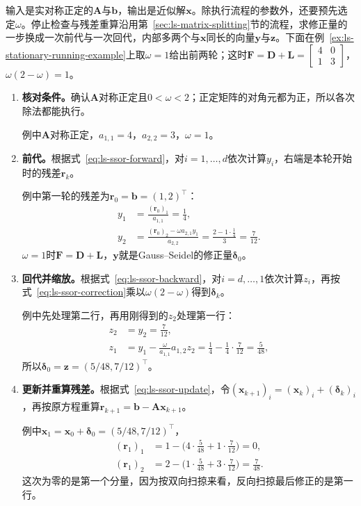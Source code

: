 输入是实对称正定的$\bm A$与$\bm b$，输出是近似解$\bm x$。除执行流程的参数外，还要预先选定$\omega$。停止检查与残差重算沿用第~\ref{sec:ls-matrix-splitting}节的流程，求修正量的一步换成一次前代与一次回代，内部多两个与$\bm x$同长的向量$\bm y$与$\bm z$。下面在例~\ref{ex:ls-stationary-running-example}上取$\omega=1$给出前两轮；这时$\bm F=\bm D+\bm L=\left[\begin{smallmatrix}4&0\\1&3\end{smallmatrix}\right]$，$\omega(2-\omega)=1$。
\begin{enumerate}
 \item \textbf{核对条件。}确认$\bm A$对称正定且$0<\omega<2$；正定矩阵的对角元都为正，所以各次除法都能执行。

 例中$\bm A$对称正定，$a_{1,1}=4$，$a_{2,2}=3$，$\omega=1$。

 \item \textbf{前代。}根据式~\eqref{eq:ls-ssor-forward}，对$i=1,\ldots,d$依次计算$y_i$，右端是本轮开始时的残差$\bm r_k$。

 例中第一轮的残差为$\bm r_0=\bm b=(1,2)^\top$：
 \[
  \begin{aligned}
  y_1&=\frac{(\bm r_0)_1}{a_{1,1}}=\frac14,\\
  y_2&=\frac{(\bm r_0)_2-\omega a_{2,1}y_1}{a_{2,2}}=\frac{2-1\cdot\tfrac14}{3}=\frac7{12} .
  \end{aligned}
 \]
 $\omega=1$时$\bm F=\bm D+\bm L$，$\bm y$就是Gauss--Seidel的修正量$\bm\delta_0$。

 \item \textbf{回代并缩放。}根据式~\eqref{eq:ls-ssor-backward}，对$i=d,\ldots,1$依次计算$z_i$，再按式~\eqref{eq:ls-ssor-correction}乘以$\omega(2-\omega)$得到$\bm\delta_k$。

 例中先处理第二行，再用刚得到的$z_2$处理第一行：
 \[
  \begin{aligned}
  z_2&=y_2=\frac7{12},\\
  z_1&=y_1-\frac{\omega}{a_{1,1}}a_{1,2}z_2=\frac14-\frac14\cdot\frac7{12}=\frac5{48},
  \end{aligned}
 \]
 所以$\bm\delta_0=\bm z=(5/48,7/12)^\top$。

 \item \textbf{更新并重算残差。}根据式~\eqref{eq:ls-ssor-update}，令$(\bm x_{k+1})_i=(\bm x_k)_i+(\bm\delta_k)_i$，再按原方程重算$\bm r_{k+1}=\bm b-\bm A\bm x_{k+1}$。

 例中$\bm x_1=\bm x_0+\bm\delta_0=(5/48,7/12)^\top$，
 \[
  \begin{aligned}
  (\bm r_1)_1&=1-\bigl(4\cdot\tfrac5{48}+1\cdot\tfrac7{12}\bigr)=0,\\
  (\bm r_1)_2&=2-\bigl(1\cdot\tfrac5{48}+3\cdot\tfrac7{12}\bigr)=\tfrac7{48} .
  \end{aligned}
 \]
 这次为零的是第一个分量，因为按双向扫掠来看，反向扫掠最后修正的是第一行。


\end{enumerate}
